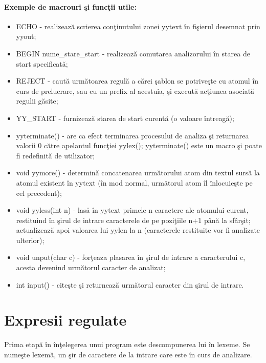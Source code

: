 \paragraph{Exemple de macrouri \c{s}i func\c{t}ii utile:}
\begin{itemize}
	\item ECHO - realizeaz\u{a} scrierea con\c{t}inutului zonei yytext \^{i}n fi\c{s}ierul desemnat prin yyout;
	\item BEGIN nume\_stare\_start - realizeaz\u{a} comutarea analizorului \^{i}n starea de start specificat\u{a};
	\item REJECT - caut\u{a} urm\u{a}toarea regul\u{a} a c\u{a}rei \c{s}ablon se potrive\c{s}te cu atomul \^{i}n curs de prelucrare, sau cu un prefix al acestuia, \c{s}i execut\u{a} ac\c{t}iunea asociat\u{a} regulii g\u{a}site;
	\item YY\_START - furnizeaz\u{a} starea de start curent\u{a} (o valoare \^{i}ntreag\u{a});
	\item yyterminate() - are ca efect terminarea procesului de analiza \c{s}i returnarea valorii 0 c\u{a}tre apelantul func\c{t}iei yylex(); yyterminate() este un macro \c{s}i poate fi redefinit\u{a} de utilizator;
	\item void yymore() - determin\u{a} concatenarea urm\u{a}torului atom din textul surs\u{a} la atomul existent \^{i}n yytext (\^{i}n mod normal, urm\u{a}torul atom \^{i}l \^{i}nlocuie\c{s}te pe cel precedent);
	\item void yyless(int n) - las\u{a} \^{i}n yytext primele n caractere ale atomului curent, restituind \^{i}n \c{s}irul de intrare caracterele de pe pozi\c{t}iile n+1 p\^{a}n\u{a} la sf\^{a}r\c{s}it; actualizeaz\u{a} apoi valoarea lui yylen la n (caracterele restituite vor fi analizate ulterior);
	\item void unput(char c) - for\c{t}eaza plasarea \^{i}n \c{s}irul de intrare a caracterului c, acesta devenind urm\u{a}torul caracter de analizat;
	\item int input() - cite\c{s}te \c{s}i returneaz\u{a} urm\u{a}torul caracter din \c{s}irul de intrare.
\end{itemize}

\section{Expresii regulate}

Prima etap\u{a} \^{i}n \^{i}n\c{t}elegerea unui program este descompunerea lui \^{i}n lexeme. Se nume\c{s}te lexem\u{a}, un \c{s}ir de caractere de la intrare care este \^{i}n curs de analizare. 

